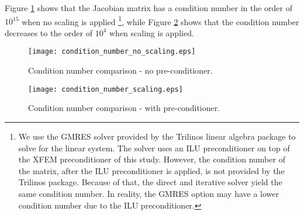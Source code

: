Figure \ref{fig:condition_number_no_scaling} shows that the Jacobian matrix has a condition number in the order of $10^{15}$ when no scaling is applied \footnote{We use the GMRES solver provided by the Trilinos linear algebra package to solve for the linear system. The solver uses an ILU preconditioner on top of the XFEM preconditioner of this study. However, the condition number of the matrix, after the ILU preconditioner is applied, is not provided by the Trilinos package. Because of that, the direct and iterative solver yield the same condition number. In reality, the GMRES option may have a lower condition number due to the ILU preconditioner.}, while Figure \ref{fig:condition_number_scaling} shows that the condition number decreases to the order of $10^4$ when scaling is applied.
%
\begin{figure}[htbp]
	\centering
	\texttt{[image: condition\_number\_no\_scaling.eps]}
	\caption[Condition number comparison - no preconditioner]{Condition number comparison - no pre-conditioner.}
	\label{fig:condition_number_no_scaling}
\end{figure}
%
\begin{figure}[htbp]
	\centering
	\texttt{[image: condition\_number\_scaling.eps]}
	\caption[Condition number comparison - with preconditioner]{Condition number comparison - with pre-conditioner.}
	\label{fig:condition_number_scaling}
\end{figure}